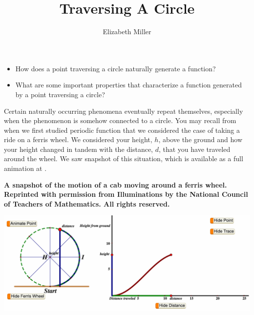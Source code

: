 \documentclass[nooutcomes, noauthor]{ximera}
\author{Elizabeth Miller}
\title{Traversing A Circle}
\begin{document}
\licenseAPC
\begin{abstract}
  
\end{abstract}
\maketitle



\begin{motivatingQuestions}\begin{itemize}
\item How does a point traversing a circle naturally generate a function?
\item What are some important properties that characterize a function generated by a point traversing a circle?
\end{itemize}\end{motivatingQuestions}



Certain naturally occurring phenomena eventually repeat themselves, especially when the phenomenon is somehow connected to a circle. You may recall from when we first studied periodic function that we considered the case of taking a ride on a ferris wheel.  We considered your height, \(h\), above the ground and how your height changed in tandem with the distance, \(d\), that you have traveled around the wheel.  We saw snapshot of this situation, which is available as a full animation at .%

\begin{center}
\textbf{A snapshot of the motion of a cab moving around a ferris wheel.  Reprinted with permission from Illuminations by the National Council of Teachers of Mathematics. All rights reserved.}
\end{center}
\begin{image}
\includegraphics[width=\textwidth]{traversing-ferris-wheel-animation.png}
\end{image}
\end{document}
